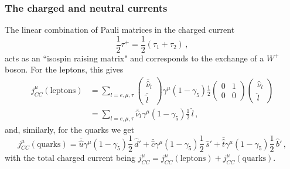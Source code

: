   \subsubsection{The charged and neutral currents}
  The linear combination of Pauli matrices in the charged current
  \begin{equation}
      \frac{1}{2}\tau^+ = \frac{1}{2}(\tau_1 + \tau_2) \,,
  \end{equation}
  acts as an ``isospin raising matrix" and corresponds to the exchange of a
  $W^+$ boson.
  For the leptons, this gives~\cite{Paschos:2007pi}
  \begin{equation}
    \begin{aligned}
      j^{\mu}_{CC}(\textrm{leptons}) &= \sum_{l=e,\mu,\tau}
      \begin{pmatrix}
          \bar{\hat{\nu}}_l \\
          \bar{\hat{l}}
      \end{pmatrix}
      \gamma^{\mu}(1-\gamma_5)\frac{1}{2}
      \begin{pmatrix}
        0 & 1 \\
        0 & 0
      \end{pmatrix}
      \begin{pmatrix}
        \hat{\nu}_l \\
          \hat{l}
      \end{pmatrix} \\
      &= \sum_{l=e,\mu,\tau} \bar{\hat{\nu}}_{l} \gamma^{\mu}(1-\gamma_5)\frac{1}{2}\, \hat{l} \,,
    \end{aligned}
  \end{equation}
  and, similarly, for the quarks we get
  \begin{equation}
      j^{\mu}_{CC}(\textrm{quarks}) =
       \bar{\hat{u}}\gamma^{\mu}(1-\gamma_5)\frac{1}{2}\,\hat{d}'
       +\bar{\hat{c}}\gamma^{\mu}(1-\gamma_5)\frac{1}{2}\,\hat{s}'
       +\bar{\hat{t}}\gamma^{\mu}(1-\gamma_5)\frac{1}{2}\,\hat{b}' \,,
  \end{equation}
  with the total charged current being $j^{\mu}_{CC} =
  j^{\mu}_{CC}(\textrm{leptons}) + j^{\mu}_{CC}(\textrm{quarks})$.

